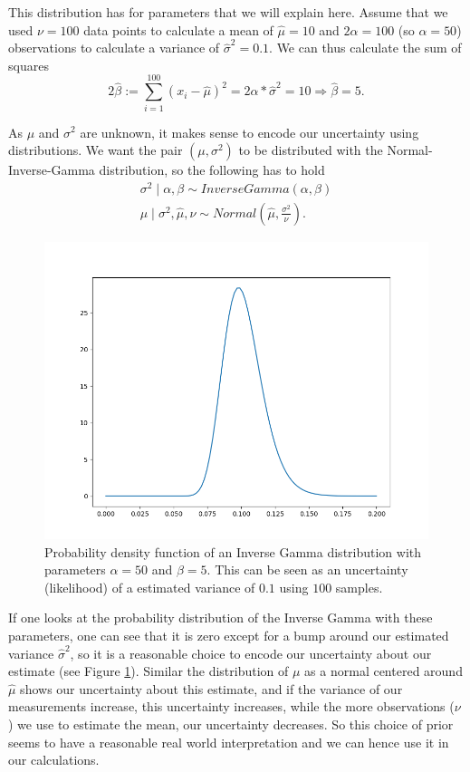 \documentclass[12pt,a4paper]{article}
\begin{document}
This distribution has for parameters that we will explain here. Assume that we used $\nu=100$ data points to calculate a mean of $\hat\mu=10$ and $2\alpha=100$ (so $\alpha=50$) observations to calculate a variance of $\hat\sigma^2=0.1$. We can thus calculate the sum of squares~$$2\hat\beta := \sum_{i=1}^{100} (x_i - \hat\mu)^2=2\alpha*\hat\sigma^2=10 \Rightarrow \hat\beta=5.$$

As $\mu$ and $\sigma^2$ are unknown, it makes sense to encode our uncertainty using distributions. We want the pair $(\mu, \sigma^2)$ to be distributed with the Normal-Inverse-Gamma distribution, so the following has to hold
\begin{gather*}
	\sigma^2 \mid \alpha, \beta \sim InverseGamma(\alpha, \beta) \\ 
	\mu \mid \sigma^2, \hat\mu, \nu \sim Normal(\hat\mu, \frac{\sigma^2}{\nu}).
\end{gather*}

\begin{figure}
	\centering
	\includegraphics{images/invgamma_example.png}
	\caption{Probability density function of an Inverse Gamma distribution with parameters $\alpha=50$ and $\beta=5$. This can be seen as an uncertainty (likelihood) of a estimated variance of $0.1$ using $100$ samples.}
	\label{fig:invgamma_example}
\end{figure}

If one looks at the probability distribution of the Inverse Gamma with these parameters, one can see that it is zero except for a bump around our estimated variance $\hat\sigma^2$, so it is a reasonable choice to encode our uncertainty about our estimate (see Figure \ref{fig:invgamma_example}). Similar the distribution of $\mu$ as a normal centered around $\hat\mu$ shows our uncertainty about this estimate, and if the variance of our measurements increase, this uncertainty increases, while the more observations ($\nu$) we use to estimate the mean, our uncertainty decreases. So this choice of prior seems to have a reasonable real world interpretation and we can hence use it in our calculations.
\end{document}
